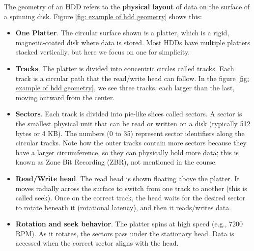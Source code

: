 \noindent
The geometry of an HDD refers to the \textbf{physical layout} of data on the surface of a spinning disk. Figure \ref{fig: example of hdd geometry} shows this:
\begin{itemize}
    \item \textbf{One Platter}. The circular surface shown is a platter, which is a rigid, magnetic-coated disk where data is stored. Most HDDs have multiple platters stacked vertically, but here we focus on one for simplicity.
    \item \textbf{Tracks}. The platter is divided into concentric circles called tracks. Each track is a circular path that the read/write head can follow. In the figure \ref{fig: example of hdd geometry}, we see three tracks, each larger than the last, moving outward from the center.
    \item \textbf{Sectors}. Each track is divided into pie-like slices called sectors. A sector is the smallest physical unit that can be read or written on a disk (typically 512 bytes or 4 KB). The numbers (0 to 35) represent sector identifiers along the circular tracks. Note how the outer tracks contain more sectors because they have a larger circumference, so they can physically hold more data; this is known as Zone Bit Recording (ZBR), not mentioned in the course.
    \item \textbf{Read/Write head}. The read head is shown floating above the platter. It moves radially across the surface to switch from one track to another (this is called seek). Once on the correct track, the head waits for the desired sector to rotate beneath it (rotational latency), and then it reads/writes data.
    \item \textbf{Rotation and seek behavior}. The platter spins at high speed (e.g., 7200 RPM). As it rotates, the sectors pass under the stationary head. Data is accessed when the correct sector aligns with the head.
\end{itemize}

